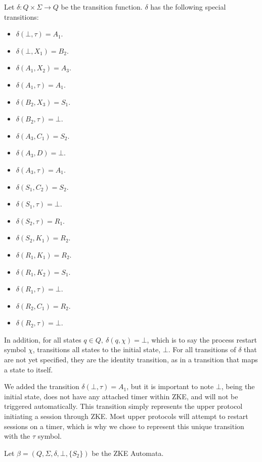 \documentclass{article}
\begin{document}
\begin{definition}
	Let $\delta: Q\times\Sigma\to Q$ be the transition function. $\delta$ has the following special transitions:
	\begin{multicols}{3}
		\begin{itemize}
			\item $\delta(\bot, \tau)=A_1$.
			\item $\delta(\bot, X_1)=B_2$.
			\item $\delta(A_1, X_2)=A_3$.
			\item $\delta(A_1, \tau)=A_1$.
			\item $\delta(B_2, X_3)=S_1$.
			\item $\delta(B_2, \tau)=\bot$.
			\item $\delta(A_3, C_1)=S_2$.
			\item $\delta(A_3, D)=\bot$.
			\item $\delta(A_3, \tau)=A_1$.
			\item $\delta(S_1, C_2)=S_2$.
			\item $\delta(S_1, \tau)=\bot$.
			\item $\delta(S_2, \tau)=R_1$.
			\item $\delta(S_2, K_1)=R_2$.
			\item $\delta(R_1, K_1)=R_2$.
			\item $\delta(R_1, K_2)=S_1$.
			\item $\delta(R_1, \tau)=\bot$.
			\item $\delta(R_2, C_1)=R_2$.
			\item $\delta(R_2, \tau)=\bot$.
		\end{itemize}
	\end{multicols}
	In addition, for all states $q\in Q,\ \delta(q, \chi) = \bot$, which is to say the process restart symbol $\chi$, transitions all states to the initial state, $\bot$.
	For all transitions of $\delta$ that are not yet specified, they are the identity transition, as in a transition that maps a state to itself.

	We added the transition $\delta(\bot, \tau)=A_1$, but it is important to note $\bot$, being the initial state, does not have any attached timer within ZKE, and will not be triggered automatically. This transition simply represents the upper protocol initiating a session through ZKE. Most upper protocols will attempt to restart sessions on a timer, which is why we chose to represent this unique transition with the $\tau$ symbol.

	Let $\beta=(Q, \Sigma, \delta, \bot, \{S_2\})$ be the ZKE Automata.
\end{definition}
\end{document}
